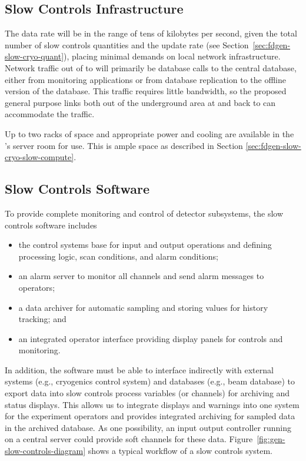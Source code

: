 \subsection{Slow Controls Infrastructure}
\label{sec:fdgen-slow-cryo-slow-infra}

The data rate will be in the range of tens of kilobytes per second, given the total number of slow controls quantities and the update rate  
(see Section~\ref{sec:fdgen-slow-cryo-quant}), placing minimal demands
on local network infrastructure.
Network traffic out of \surf to \fnal will primarily be database calls
to the central  database, either from monitoring applications or from
database replication to the offline version of the  database.  This
traffic requires little bandwidth, so the proposed general purpose
links both out of the %
underground area at \surf and back to \fnal can accommodate the traffic.

Up to two racks of space and appropriate power and cooling are
available in the 's  server room for  use. This is ample space as described in Section
\ref{sec:fdgen-slow-cryo-slow-compute}.


\subsection{Slow Controls Software}
\label{sec:fdgen-slow-cryo-sw}

To provide complete monitoring and control of detector subsystems, the slow controls software includes
%
\begin{itemize}
 \item the control systems base for input and output operations
  and defining processing logic, scan conditions, and alarm conditions;
 \item an alarm server to monitor all channels and send alarm
  messages to operators;
 \item a data archiver for automatic sampling and storing values for history tracking; and 
 \item an integrated operator interface providing display panels for
  controls and monitoring.
\end{itemize}

In addition, the software must be able to 
interface indirectly with external systems (e.g., cryogenics control
system) and databases (e.g., beam database) to export data into
slow controls process variables (or channels) for archiving and status
displays. This allows us to integrate displays and warnings into one
system for the experiment operators and %
provides integrated
archiving for sampled data in the archived database. As one possibility, an input output controller running on a central 
server could provide soft channels for these data.
Figure~\ref{fig:gen-slow-controls-diagram} shows a typical workflow of a
slow controls system.

